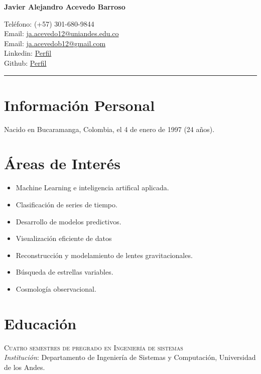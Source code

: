 \documentclass[11pt, a4paper]{article}
\newcommand{\years}[1]{\marginnote{\scriptsize #1}}
\begin{document}
\begin{center}{\huge \bf Javier Alejandro Acevedo Barroso}\\[1cm]\end{center}
\begin{minipage}[t]{0.465\textwidth}
  Teléfono: (+57) 301-680-9844 \\
  Email: \href{mailto:ja.acevedo12@uniandes.edu.co}{ja.acevedo12@uniandes.edu.co}\\
  Email: \href{mailto:ja.acevedob12@gmail.com}{ja.acevedob12@gmail.com}\\
  Linkedin: \href{https://www.linkedin.com/in/javier-alejandro-acevedo-barroso-494155203/}{Perfil}\\
  Github: \href{https://github.com/clarkguilty}{Perfil}\\
\end{minipage}

\hrule

\section*{Información Personal}
Nacido en Bucaramanga, Colombia, el 4 de enero de 1997 (24 años).

\section*{Áreas de Interés}
\begin{itemize}
\item Machine Learning e inteligencia artifical aplicada.
\item Clasificación de series de tiempo.
\item Desarrollo de modelos predictivos.
\item Visualización eficiente de datos
\item Reconstrucción y modelamiento de lentes gravitacionales.
\item Búsqueda de estrellas variables.
\item Cosmología observacional.


\end{itemize}

\section*{Educación}
\noindent
\years{2015-2017}\textsc{Cuatro semestres de pregrado en Ingeniería de sistemas}\\ {\emph{Institución}}: Departamento de Ingeniería de Sistemas y Computación, Universidad de los Andes.\\
\end{document}
